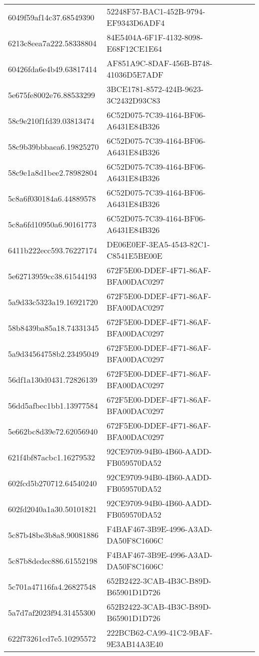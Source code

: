 \begin{tabular}{ll}
6049f59af14c37.68549390 & 52248F57-BAC1-452B-9794-EF9343D6ADF4 \\
6213c8eea7a222.58338804 & 84E5404A-6F1F-4132-8098-E68F12CE1E64 \\
60426fda6e4b49.63817414 & AF851A9C-8DAF-456B-B748-41036D5E7ADF \\
5e675fe8002e76.88533299 & 3BCE1781-8572-424B-9623-3C2432D93C83 \\
58c9e210f1fd39.03813474 & 6C52D075-7C39-4164-BF06-A6431E84B326 \\
58c9b39bbbaea6.19825270 & 6C52D075-7C39-4164-BF06-A6431E84B326 \\
58c9e1a8d1bee2.78982804 & 6C52D075-7C39-4164-BF06-A6431E84B326 \\
5c8a6f030184a6.44889578 & 6C52D075-7C39-4164-BF06-A6431E84B326 \\
5c8a6fd10950a6.90161773 & 6C52D075-7C39-4164-BF06-A6431E84B326 \\
6411b222ecc593.76227174 & DE06E0EF-3EA5-4543-82C1-C8541E5BE00E \\
5e62713959cc38.61544193 & 672F5E00-DDEF-4F71-86AF-BFA00DAC0297 \\
5a9d33c5323a19.16921720 & 672F5E00-DDEF-4F71-86AF-BFA00DAC0297 \\
58b8439ba85a18.74331345 & 672F5E00-DDEF-4F71-86AF-BFA00DAC0297 \\
5a9d34564758b2.23495049 & 672F5E00-DDEF-4F71-86AF-BFA00DAC0297 \\
56df1a130d0431.72826139 & 672F5E00-DDEF-4F71-86AF-BFA00DAC0297 \\
56dd5afbec1bb1.13977584 & 672F5E00-DDEF-4F71-86AF-BFA00DAC0297 \\
5e662bc8d39e72.62056940 & 672F5E00-DDEF-4F71-86AF-BFA00DAC0297 \\
621f4bf87acbc1.16279532 & 92CE9709-94B0-4B60-AADD-FB059570DA52 \\
602fcd5b270712.64540240 & 92CE9709-94B0-4B60-AADD-FB059570DA52 \\
602fd2040a1a30.50101821 & 92CE9709-94B0-4B60-AADD-FB059570DA52 \\
5c87b48be3b8a8.90081886 & F4BAF467-3B9E-4996-A3AD-DA50F8C1606C \\
5c87b8dedec886.61552198 & F4BAF467-3B9E-4996-A3AD-DA50F8C1606C \\
5c701a47116fa4.26827548 & 652B2422-3CAB-4B3C-B89D-B65901D1D726 \\
5a7d7af2023f94.31455300 & 652B2422-3CAB-4B3C-B89D-B65901D1D726 \\
622f73261cd7e5.10295572 & 222BCB62-CA99-41C2-9BAF-9E3AB14A3E40 \\

\end{tabular}
